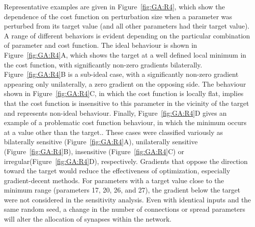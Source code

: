 Representative examples are given in Figure~\ref{fig:GA:R4}, which show
the dependence of the cost function on perturbation size when a
parameter was perturbed from its target value (and all other
parameters had their target value). A range of different behaviors is
evident depending on the particular combination of parameter and cost
function. The ideal behaviour is shown in Figure~\ref{fig:GA:R4}A, which
shows the target at a well defined local minimum in the cost function,
with significantly non-zero gradients bilaterally. Figure~\ref{fig:GA:R4}B is a sub-ideal case, with a significantly non-zero
gradient appearing only unilaterally, a zero gradient on the opposing
side.  The behaviour shown in Figure~\ref{fig:GA:R4}C, in which the cost
function is locally flat, implies that the cost function is
insensitive to this parameter in the vicinity of the target and
represents non-ideal behaviour. Finally, Figure~\ref{fig:GA:R4}D gives an
example of a problematic cost function behaviour, in which the minimum
occurs at a value other than the target.. These cases were
classified variously as bilaterally sensitive (Figure~\ref{fig:GA:R4}A),
unilaterally sensitive (Figure~\ref{fig:GA:R4}B), insensitive (Figure~\ref{fig:GA:R4}C) or irregular(Figure~\ref{fig:GA:R4}D), respectively.
Gradients that oppose the direction toward the target
would reduce the effectiveness of optimization, especially
gradient-decent methods.  For parameters with a target value close to
the minimum range (parameters 17, 20, 26, and 27), the gradient below
the target were not considered in the sensitivity analysis.  Even with
identical {\ANF} inputs and the same random seed, a change in the number
of connections or spread parameters will alter the allocation of
synapses within the network.



